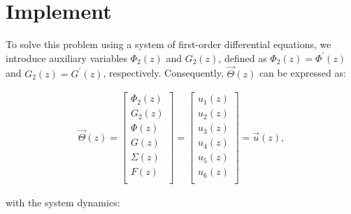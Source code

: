 \documentclass[11pt]{article}
\begin{document}
\section{Implement}
%
%
To solve this problem using a system of first-order differential equations, we introduce auxiliary variables $\Phi_2(z)$ and $G_2(z)$, defined as $\Phi_2(z) = \Phi^{\prime}(z)$ and $G_2(z) = G^{\prime}(z)$, respectively. Consequently, $\vec{\Theta} \left( {z} \right)$ can be expressed as:

\begin{equation}
	\begin{split}
		\vec \Theta \left( z \right) = \left[ {\begin{matrix}
				{{\Phi _2}\left( z \right)}  \\ 
				{{G_2}\left( z \right)}  \\ 
				{\Phi \left( z \right)}  \\ 
				{G\left( z \right)}  \\ 
				{\Sigma \left( z \right)}  \\ 
				{F\left( z \right)}  \\  
		\end{matrix} } \right] = \left[ {\begin{matrix}
				{{u_1}\left( z \right)}  \\ 
				{{u_2}\left( z \right)}  \\ 
				{{u_3}\left( z \right)}  \\ 
				{{u_4}\left( z \right)}  \\ 
				{{u_5}\left( z \right)}  \\ 
				{{u_6}\left( z \right)}  \\ 
		\end{matrix} } \right] = \vec u\left( z\right),
	\end{split}
\end{equation}

with the system dynamics: 
\end{document}
